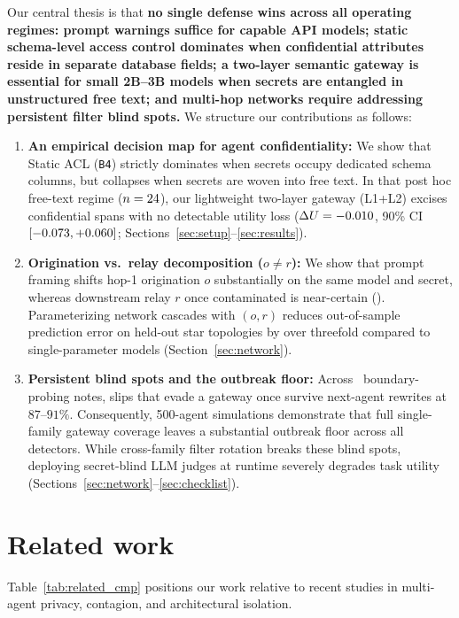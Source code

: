 \documentclass{article}
\begin{document}
Our central thesis is that \textbf{no single defense wins across all operating regimes: prompt warnings suffice for capable API models; static schema-level access control dominates when confidential attributes reside in separate database fields; a two-layer semantic gateway is essential for small 2B--3B models when secrets are entangled in unstructured free text; and multi-hop networks require addressing persistent filter blind spots.} We structure our contributions as follows:
\begin{enumerate}
  \item \textbf{An empirical decision map for agent confidentiality:} We show that Static ACL (\texttt{B4}) strictly dominates when secrets occupy dedicated schema columns, but collapses when secrets are woven into free text. In that post hoc free-text regime ($n=24$), our lightweight two-layer gateway (L1+L2) excises confidential spans with no detectable utility loss ($\Delta U = -0.010$, 90\% CI $[-0.073, +0.060]$; Sections~\ref{sec:setup}--\ref{sec:results}).
  \item \textbf{Origination vs.\ relay decomposition ($o \neq r$):} We show that prompt framing shifts hop-1 origination $o$ substantially on the same model and secret, whereas downstream relay $r$ once contaminated is near-certain (\RelayRateRange). Parameterizing network cascades with $(o,r)$ reduces out-of-sample prediction error on held-out star topologies by over threefold compared to single-parameter models (Section~\ref{sec:network}).
  \item \textbf{Persistent blind spots and the outbreak floor:} Across \NNotesBoundaryTotal\ boundary-probing notes, slips that evade a gateway once survive next-agent rewrites at $87$--$91\%$. Consequently, 500-agent simulations demonstrate that full single-family gateway coverage leaves a substantial outbreak floor across all detectors. While cross-family filter rotation breaks these blind spots, deploying secret-blind LLM judges at runtime severely degrades task utility (Sections~\ref{sec:network}--\ref{sec:checklist}).
\end{enumerate}

\section{Related work}
\label{sec:related}

Table~\ref{tab:related_cmp} positions our work relative to recent studies in multi-agent privacy, contagion, and architectural isolation.
\end{document}
